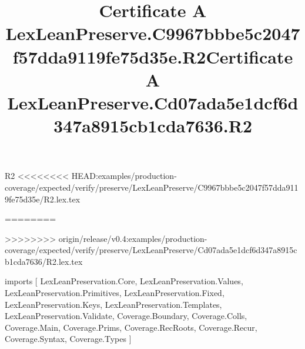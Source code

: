 \begin{lexlean}{R2}
<<<<<<<< HEAD:examples/production-coverage/expected/verify/preserve/LexLeanPreserve/C9967bbbe5c2047f57dda9119fe75d35e/R2.lex.tex
\title{Certificate A LexLeanPreserve.C9967bbbe5c2047f57dda9119fe75d35e.R2}
========
\title{Certificate A LexLeanPreserve.Cd07ada5e1dcf6d347a8915cb1cda7636.R2}
>>>>>>>> origin/release/v0.4:examples/production-coverage/expected/verify/preserve/LexLeanPreserve/Cd07ada5e1dcf6d347a8915cb1cda7636/R2.lex.tex
\begin{coremodule}
imports [
  LexLeanPreservation.Core,
  LexLeanPreservation.Values,
  LexLeanPreservation.Primitives,
  LexLeanPreservation.Fixed,
  LexLeanPreservation.Keys,
  LexLeanPreservation.Templates,
  LexLeanPreservation.Validate,
  Coverage.Boundary,
  Coverage.Colls,
  Coverage.Main,
  Coverage.Prims,
  Coverage.RecRoots,
  Coverage.Recur,
  Coverage.Syntax,
  Coverage.Types
]


\end{coremodule}
\end{lexlean}
